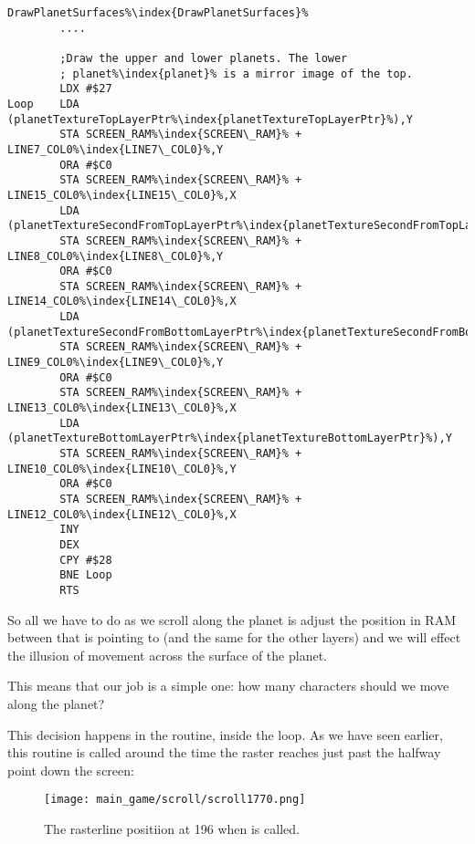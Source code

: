 \begin{lstlisting}[escapechar=\%]
DrawPlanetSurfaces%\index{DrawPlanetSurfaces}%
        ....

        ;Draw the upper and lower planets. The lower
        ; planet%\index{planet}% is a mirror image of the top.
        LDX #$27
Loop    LDA (planetTextureTopLayerPtr%\index{planetTextureTopLayerPtr}%),Y
        STA SCREEN_RAM%\index{SCREEN\_RAM}% + LINE7_COL0%\index{LINE7\_COL0}%,Y
        ORA #$C0
        STA SCREEN_RAM%\index{SCREEN\_RAM}% + LINE15_COL0%\index{LINE15\_COL0}%,X
        LDA (planetTextureSecondFromTopLayerPtr%\index{planetTextureSecondFromTopLayerPtr}%),Y
        STA SCREEN_RAM%\index{SCREEN\_RAM}% + LINE8_COL0%\index{LINE8\_COL0}%,Y
        ORA #$C0
        STA SCREEN_RAM%\index{SCREEN\_RAM}% + LINE14_COL0%\index{LINE14\_COL0}%,X
        LDA (planetTextureSecondFromBottomLayerPtr%\index{planetTextureSecondFromBottomLayerPtr}%),Y
        STA SCREEN_RAM%\index{SCREEN\_RAM}% + LINE9_COL0%\index{LINE9\_COL0}%,Y
        ORA #$C0
        STA SCREEN_RAM%\index{SCREEN\_RAM}% + LINE13_COL0%\index{LINE13\_COL0}%,X
        LDA (planetTextureBottomLayerPtr%\index{planetTextureBottomLayerPtr}%),Y
        STA SCREEN_RAM%\index{SCREEN\_RAM}% + LINE10_COL0%\index{LINE10\_COL0}%,Y
        ORA #$C0
        STA SCREEN_RAM%\index{SCREEN\_RAM}% + LINE12_COL0%\index{LINE12\_COL0}%,X
        INY
        DEX
        CPY #$28
        BNE Loop 
        RTS
\end{lstlisting}

So all we have to do as we scroll along the planet is adjust the position in RAM between 
that   is pointing to (and the same for the other layers) and we will effect
the illusion of movement across the surface of the planet.

This means that our job is a simple one: how many characters should we move along the planet?

This decision happens in the  routine, inside the  loop. As
we have seen earlier, this routine is called around the time the raster reaches just past the halfway point
down the screen:

\begin{figure}[H]
    \centering
      \texttt{[image: main\_game/scroll/scroll1770.png]}%
\caption{The rasterline positiion at 196 when  is called.}
\end{figure}

